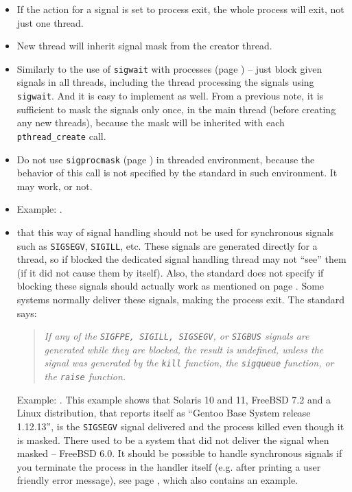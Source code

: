 \begin{itemize}
\item If the action for a signal is set to process exit, the whole process
will exit, not just one thread.
\item New thread will inherit signal mask from the creator thread.
\item Similarly to the use of \texttt{sigwait} with processes (page
\pageref{SIGWAIT}) -- just block given signals in all threads, including the
thread processing the signals using \texttt{sigwait}.
  And it is easy to implement as well.  From a previous note, it is
sufficient to mask the signals only once, in the main thread (before creating
any new threads), because the mask will be inherited with each
\texttt{pthread\_create} call.
\item Do not use \texttt{sigprocmask} (page \pageref{SIGPROCMASK}) in threaded
environment, because the behavior of this call is not specified by the standard
in such environment. It may work, or not.
\item \label{THREADS_SIGWAIT} Example: .
\item {} that this way of signal handling should not be used for
synchronous signals such as \texttt{SIGSEGV}, \texttt{SIGILL}, etc. These
signals are generated directly for a thread, so if blocked the dedicated signal
handling thread may not ``see'' them (if it did not cause them by itself).
Also, the standard does not specify if blocking these signals should actually
work as mentioned on page \pageref{SPECIALSIGNALS}. Some systems
normally deliver these signals, making the process exit. The standard says:

\begin{quote}
\emph{If any of the \texttt{SIGFPE, SIGILL, SIGSEGV}, or \texttt{SIGBUS} signals
are generated while they are blocked, the result is undefined, unless the signal
was generated by the \texttt{kill} function, the \texttt{sigqueue} function, or
the \texttt{raise} function.}
\end{quote}

Example: . This example shows that
Solaris 10 and 11, FreeBSD 7.2 and a Linux distribution, that reports
itself as ``Gentoo Base System release 1.12.13'', is the \texttt{SIGSEGV} signal
delivered and the process killed even though it is masked.
There used to be a system that did not deliver the signal when masked
-- FreeBSD 6.0.  It should be possible to handle synchronous signals
if you terminate the process in the handler itself (e.g. after printing a user
friendly error message), see page \pageref{SPECIALSIGNALS}, which also contains
an example.

\end{itemize}


